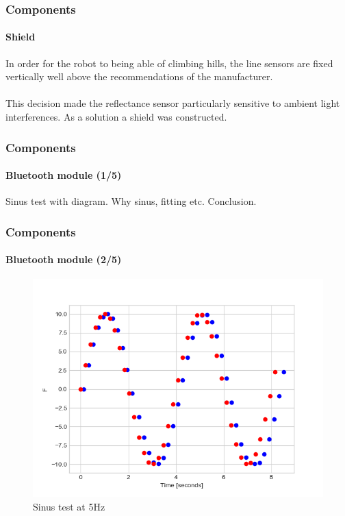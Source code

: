 \documentclass[10pt]{beamer}
\begin{document}

\begin{frame}
\frametitle{Components}
\framesubtitle{Shield}
In order for the robot to being able of climbing hills, the line sensors are fixed vertically well above the recommendations of the manufacturer. \\~\\
This decision made the reflectance sensor particularly sensitive to ambient light interferences. As a solution a shield was constructed. 
\end{frame}


\begin{frame}
\frametitle{Components}
\framesubtitle{Bluetooth module (1/5)}
Sinus test with diagram. Why sinus, fitting etc. Conclusion.
\end{frame}


\begin{frame}
\frametitle{Components}
\framesubtitle{Bluetooth module (2/5)}
\begin{figure}[hbtp]
\centering
\includegraphics[scale=0.45]{figures/sin-sending-merged-5hz.png}
\caption{Sinus test at 5Hz}
\end{figure}
\end{frame}

\end{document}
